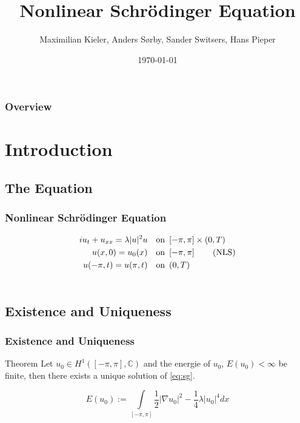 \documentclass{beamer}
\title[TMA4212 - Project]{Nonlinear Schrödinger Equation}
\author[Maximilian, Anders, Sander, Hans]{Maximilian Kieler, Anders Sørby, Sander Switsers, Hans Pieper}
\institute[]{
	Numerical solution of differential equations by difference methods
}
\date{\today}
\begin{document}
	\begin{frame}
		\titlepage
	\end{frame}
	
	\begin{frame}
		\frametitle{Overview}
		\tableofcontents
	\end{frame}

	\section{Introduction}
	\subsection{The Equation}
	
	\begin{frame}
		\frametitle{Nonlinear Schrödinger Equation}
		\begin{block}{}
			\begin{align}
				i u_t + u_{xx} = \lambda |u|^2 u &  \text{\quad on } \left[-\pi, \pi \right] \times \left(0, T\right) \nonumber \\
				u(x,0) = u_0(x) &  \text{\quad on } \left[-\pi, \pi \right] \tag{NLS} \label{eq:sg} \\ 
				u(-\pi,t) = u(\pi,t) &  \text{\quad on } \left(0,T \right) \nonumber \\
				\nonumber
			\end{align}
		\end{block}
	\end{frame}
	
	\subsection{Existence and Uniqueness}
	\begin{frame}
		\frametitle{Existence and Uniqueness}
		\begin{block}{Theorem}
			Let $u_0\in H^1(\left[-\pi, \pi \right],\mathbb{C})$ and the energie of $u_0$, $E(u_0)<\infty$ be finite, then there exists a unique solution of \ref{eq:sg}.
		\end{block}
		\begin{equation*}
			E(u_0):=\int\limits_{\left[-\pi, \pi \right]} \frac{1}{2} |\nabla u_0|^2-\frac{1}{4}\lambda|u_0|^4 dx
		\end{equation*}
	\end{frame}
	
\end{document}
